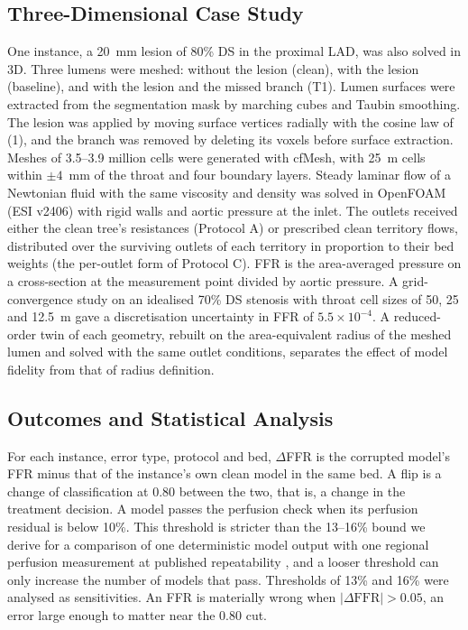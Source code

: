 \documentclass[journal]{IEEEtran}
\begin{document}
\subsection{Three-Dimensional Case Study}
One instance, a 20~mm lesion of 80\% DS in the proximal LAD, was also solved in 3D. Three lumens were meshed: without the lesion (clean), with the lesion
(baseline), and with the lesion and the missed branch (T1). Lumen surfaces were extracted from the segmentation
mask by marching cubes and Taubin smoothing. The lesion was applied by moving surface vertices radially with the
cosine law of (1), and the branch was removed by deleting its voxels before surface extraction. Meshes of 3.5--3.9
million cells were generated with cfMesh, with 25~\textmu m cells within $\pm 4$~mm of the throat and four boundary
layers. Steady laminar flow of a Newtonian fluid with the same viscosity and density was solved in OpenFOAM (ESI
v2406) with rigid walls and aortic pressure at the inlet. The outlets received either the clean tree's resistances
(Protocol A) or prescribed clean territory flows, distributed over the surviving outlets of each territory in
proportion to their bed weights (the per-outlet form of Protocol C). FFR is the area-averaged pressure on a
cross-section at the measurement point divided by aortic pressure. A grid-convergence study on an idealised 70\% DS
stenosis with throat cell sizes of 50, 25 and 12.5~\textmu m gave a discretisation uncertainty in FFR of
$5.5\times10^{-4}$. A reduced-order twin of each geometry, rebuilt on the area-equivalent radius of the meshed lumen
and solved with the same outlet conditions, separates the effect of model fidelity from that of radius definition.

\subsection{Outcomes and Statistical Analysis}
For each instance, error type, protocol and bed, $\Delta$FFR is the corrupted model's FFR minus that of the
instance's own clean model in the same bed. A flip is a change of classification at 0.80 between the two, that is,
a change in the treatment decision. A model passes the perfusion check when its perfusion residual is below 10\%.
This threshold is stricter than the 13--16\% bound we derive for a comparison of one deterministic model output
with one regional perfusion measurement at published repeatability \cite{schindler2023,brown2018}, and a looser
threshold can only increase the number of models that pass. Thresholds of 13\% and 16\% were analysed as
sensitivities. An FFR is materially wrong when $|\Delta\mathrm{FFR}| > 0.05$, an error large enough to matter near
the 0.80 cut.
\end{document}
